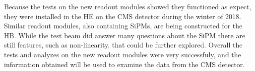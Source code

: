 Because the tests on the new readout modules showed they functioned as expect, they were installed in the HE on the CMS detector during the winter of 2018. Similar readout modules, also containing SiPMs, are being constructed for the HB. While the test beam did answer many questions about the SiPM there are still features, such as non-linearity, that could be further explored. Overall the tests and analyzes on the new readout modules were very successfuly, and the information obtained will be used to examine the data from the CMS detector.

